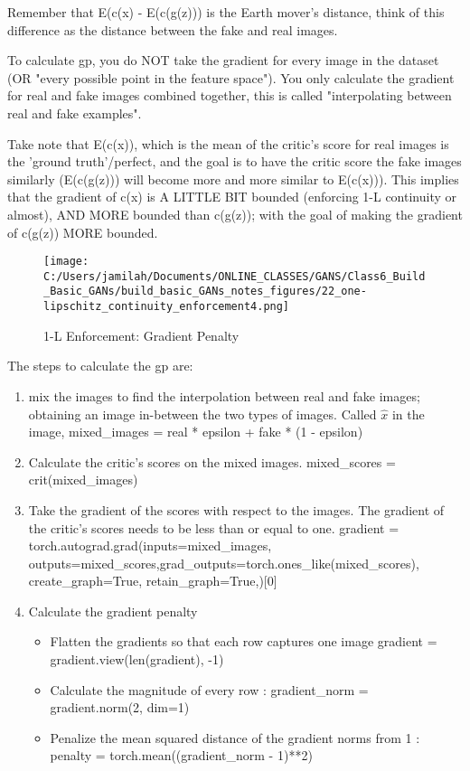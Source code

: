 \documentclass[11pt, onecolumn]{article}
\begin{document}
Remember that E(c(x) - E(c(g(z))) is the Earth mover's distance, think of this difference as the distance between the fake and real images.

To calculate gp, you do NOT take the gradient for every image in the dataset (OR "every possible point in the feature space").  You only calculate the gradient for real and fake images combined together, this is called "interpolating between real and fake examples". 

Take note that E(c(x)), which is the mean of the critic's score for real images is the 'ground truth'/perfect, and the goal is to have the critic score the fake images similarly (E(c(g(z))) will become more and more similar to E(c(x))).  This implies that the gradient of c(x) is A LITTLE BIT bounded (enforcing 1-L continuity or almost), AND MORE bounded than c(g(z)); with the goal of making the gradient of c(g(z)) MORE bounded.

\begin{figure}[htp]
\begin{center}
\texttt{[image: C:/Users/jamilah/Documents/ONLINE\_CLASSES/GANS/Class6\_Build\_Basic\_GANs/build\_basic\_GANs\_notes\_figures/22\_one-lipschitz\_continuity\_enforcement4.png]}
\end{center}
\caption{1-L Enforcement: Gradient Penalty}
\label{22_one-lipschitz_continuity_enforcement4}
\end{figure}

The steps to calculate the gp are:
\begin{enumerate}
\item mix the images to find the interpolation between real and fake images; obtaining an image in-between the two types of images.  Called $\hat{x}$ in the image, mixed_images = real * epsilon + fake * (1 - epsilon)

\item Calculate the critic's scores on the mixed images. mixed_scores = crit(mixed_images)
    
\item Take the gradient of the scores with respect to the images. The gradient of the critic's scores needs to be less than or equal to one. gradient = torch.autograd.grad(inputs=mixed_images, outputs=mixed_scores,grad_outputs=torch.ones_like(mixed_scores), create_graph=True, retain_graph=True,)[0]

\item Calculate the gradient penalty
\begin{itemize}
\item Flatten the gradients so that each row captures one image
gradient = gradient.view(len(gradient), -1)
\item Calculate the magnitude of every row :  gradient_norm = gradient.norm(2, dim=1)
\item Penalize the mean squared distance of the gradient norms from 1 :  penalty = torch.mean((gradient_norm - 1)**2)
\end{itemize}
\end{enumerate}
\end{document}

